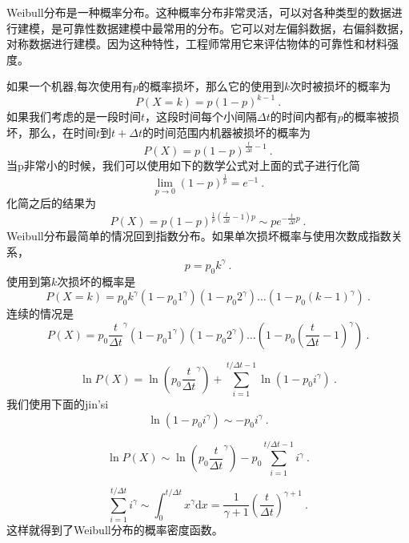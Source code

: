 
Weibull分布是一种概率分布。这种概率分布非常灵活，可以对各种类型的数据进行建模，是可靠性数据建模中最常用的分布。它可以对左偏斜数据，右偏斜数据，对称数据进行建模。因为这种特性，工程师常用它来评估物体的可靠性和材料强度。

如果一个机器,每次使用有$p$的概率损坏，那么它的使用到$k$次时被损坏的概率为
\begin{equation}
P(X=k)=p(1-p)^{k-1}~.
\end{equation}
如果我们考虑的是一段时间$t$，这段时间每个小间隔$\Delta t$的时间内都有$p$的概率被损坏，那么，在时间$t$到$t+\Delta t$的时间范围内机器被损坏的概率为
\begin{equation}
P(X)=p(1-p)^{\frac{t}{\Delta t}-1}~.
\end{equation}
当p非常小的时候，我们可以使用如下的数学公式对上面的式子进行化简
\begin{equation}
\lim _{p \rightarrow 0}(1-p)^{\frac{1}{p}}=e^{-1}~.
\end{equation}
化简之后的结果为
\begin{equation}
P(X)=p(1-p)^{\frac{1}{p}\left(\frac{t}{\Delta t}-1\right) p} \sim p e^{-\frac{t}{\Delta t} p}~.
\end{equation}
Weibull分布最简单的情况回到指数分布。如果单次损坏概率与使用次数成指数关系，
\begin{equation}
p=p_0 k^\gamma~.
\end{equation}
使用到第$k$次损坏的概率是
\begin{equation}
P(X=k)=p_0 k^\gamma\left(1-p_0 1^\gamma\right)\left(1-p_0 2^\gamma\right) \ldots\left(1-p_0(k-1)^\gamma\right)~.
\end{equation}
连续的情况是
\begin{equation}
P(X)=p_0 \frac{t}{\Delta t}^\gamma\left(1-p_0 1^\gamma\right)\left(1-p_0 2^\gamma\right) \ldots\left(1-p_0\left(\frac{t}{\Delta t}-1\right)^\gamma\right)~.
\end{equation}

\begin{equation}
\ln P(X)=\ln \left(p_0 \frac{t}{\Delta t}^\gamma\right)+\sum_{i=1}^{t / \Delta t-1} \ln \left(1-p_0 i^\gamma\right)~.
\end{equation}
我们使用下面的jin'si
\begin{equation}
\ln \left(1-p_0 i^\gamma\right) \sim-p_0 i^\gamma~.
\end{equation}

\begin{equation}
\ln P(X) \sim \ln \left(p_0 \frac{t}{\Delta t}^\gamma\right)-p_0 \sum_{i=1}^{t / \Delta t-1} i^\gamma~.
\end{equation}

\begin{equation}
\sum_{i=1}^{t / \Delta t} i^\gamma \sim \int_0^{t / \Delta t} x^\gamma \mathrm{d} x=\frac{1}{\gamma+1}\left(\frac{t}{\Delta t}\right)^{\gamma+1}~.
\end{equation}
这样就得到了Weibull分布的概率密度函数。